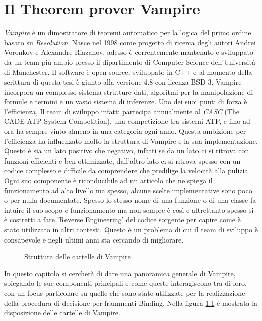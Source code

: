 \documentclass[./main.tex]{subfiles}
\begin{document}
\chapter{Il Theorem prover Vampire} \label{chap:vampire}
\textit{Vampire} \cite{vampire1} \cite{vampire2} \cite{vampireWebsite} è un dimostratore di teoremi automatico
per la logica del primo ordine basato su \textit{Resolution}.
Nasce nel 1998 come progetto di ricerca degli autori Andrei Voronkov e Alexandre Riazanov,
adesso è correntemente mantenuto e sviluppato da un team più ampio presso il dipartimento di Computer Science dell'Università di Manchester. 
Il software è open-source, sviluppato in C++ e al momento della scrittura di questa tesi è giunto alla versione 4.8 con licenza BSD-3.
Vampire incorpora un complesso sistema strutture dati, algoritmi per la manipolazione di formule e termini e un vasto sistema di inferenze.
Uno dei suoi punti di forza è l'efficienza, Il team di sviluppo infatti partecipa annualmente al \textit{CASC} (The CADE ATP System Competition),
una competizione tra sistemi ATP, e fino ad ora ha sempre vinto almeno in una categoria ogni anno.
Questa ambizione per l'efficienza ha influenzato molto la struttura di Vampire e la sua implementazione.
Questo è sia un lato positivo che negativo, infatti se da un lato ci si ritrova con funzioni efficienti e ben ottimizzate,
dall'altro lato ci si ritrova spesso con un codice complesso e difficile da comprendere che predilige la velocità alla pulizia.
Ogni suo componente è riconducibile ad un articolo che ne spiega il funzionamento ad alto livello ma spesso,
alcune scelte implementative sono poco o per nulla documentate. 
Spesso lo stesso nome di una funzione o di una classe fa intuire il suo scopo e funzionamento ma 
non sempre è così e altrettanto spesso si è costretti a fare 'Reverse Engineering' del codice sorgente per capire come è stato utilizzato in altri contesti.
Questo è un problema di cui il team di sviluppo è consapevole e negli ultimi anni sta cercando di migliorare.
\begin{figure}[ht]
    \centering
    
    \caption{Struttura delle cartelle di Vampire.}
    \label{fig:vampire_cartelle}
\end{figure}
In questo capitolo si cercherà di dare una panoramica generale di Vampire, spiegando le sue componenti principali e come queste interagiscono tra di loro,
con un focus particolare su quelle che sono state utilizzate per la realizzazione della procedura di decisione per frammenti Binding.
Nella figura \ref{fig:vampire_cartelle} è mostrata la disposizione delle cartelle di Vampire.
\end{document}
